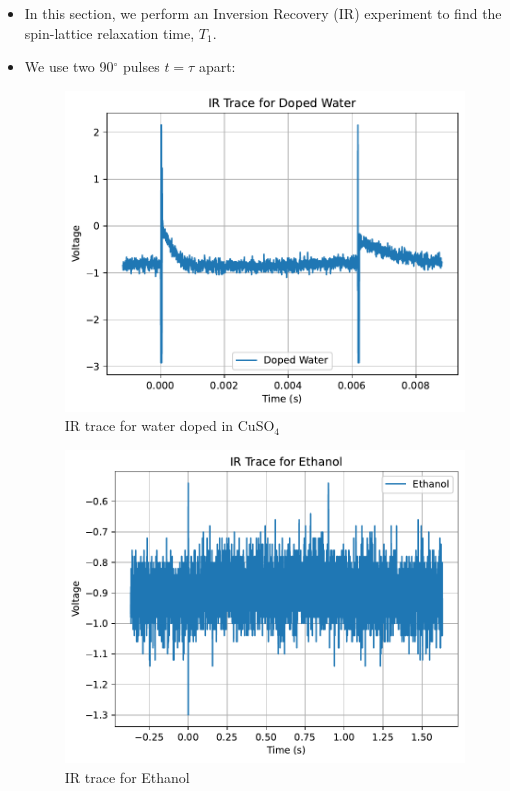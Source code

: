 \documentclass{article}
\newcommand{\degree}{$^{\circ}$ }
\begin{document}
\begin{itemize}
    \item In this section, we perform an Inversion Recovery (IR) experiment to find the spin-lattice relaxation time, $T_1$.
    \item We use two 90\degree pulses $t = \tau$ apart:
    \begin{figure}[h!]
        \centering
        \includegraphics[scale = 0.57]{../images/B3_Doped_Water}
        \caption{IR trace for water doped in CuSO$_4$}
        \label{fig:B3_Doped_Water}
    \end{figure}

    \begin{figure}[h!]
        \centering
        \includegraphics[scale = 0.57]{../images/B3_Ethanol}
        \caption{IR trace for Ethanol}
        \label{fig:B3_Ethanol}
    \end{figure}


\end{itemize}
\end{document}

